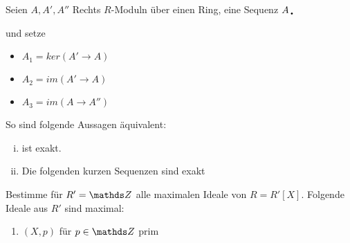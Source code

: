 \documentclass[ngerman, parskip=half, titlepage=false]{scrartcl}
\begin{document}
\begin{Lem}
  Seien $A,A',A''$ Rechts $R$-Moduln über einen Ring, eine Sequenz
   $A_{\text{\Huge.}}$\\
   \begin{center}
   \end{center}
   und setze 
   \begin{itemize}
   \item $A_1 = ker(A' \rightarrow A) $
   \item $A_2 = im(A' \rightarrow A)$
   \item $A_3 = im(A \rightarrow A'')$
   \end{itemize}
   So sind folgende Aussagen äquivalent:\\
   \begin{enumerate}[i)]
     \item 
       ist exakt.
     \item Die folgenden kurzen Sequenzen sind exakt\\
       \begin{center}
     \end{center}
   \end{enumerate}
 \end{Lem}

\begin{Auf}
  Bestimme für $R'=\Z$ alle maximalen Ideale von $R=R'[X]$.
  Folgende Ideale aus $R'$ sind maximal:
  \begin{enumerate}
    \item $(X,p)$ für $p \in \Z$ prim 
  \end{enumerate}
\end{Auf}
\end{document}
